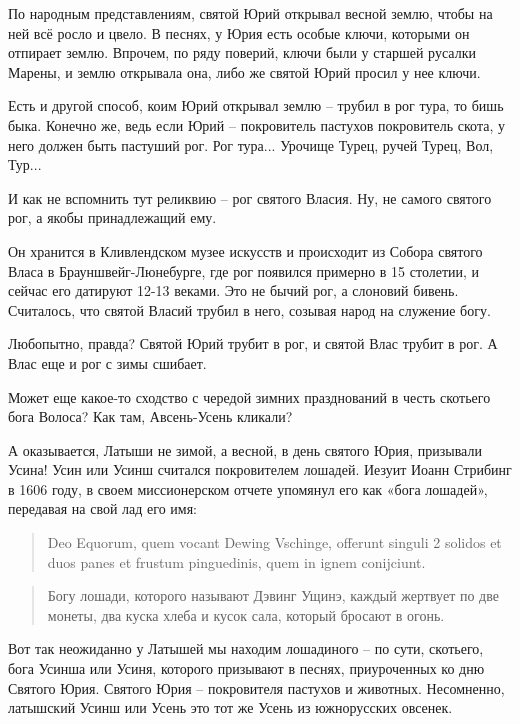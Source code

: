 \documentclass[a5paper,11pt,openany]{article}
\begin{document}
   По народным представлениям, святой Юрий открывал весной землю, чтобы на ней всё росло и цвело. В песнях, у Юрия есть особые ключи, которыми он отпирает землю. Впрочем, по ряду поверий, ключи были у старшей русалки Марены, и землю открывала она, либо же святой Юрий просил у нее ключи.

  Есть и другой способ, коим Юрий открывал землю – трубил в рог тура, то бишь быка. Конечно же, ведь если Юрий – покровитель пастухов покровитель скота, у него должен быть пастуший рог. Рог тура... Урочище Турец, ручей Турец, Вол, Тур...

   И как не вспомнить тут реликвию – рог святого Власия. Ну, не самого святого рог, а якобы принадлежащий ему.

   
   Он хранится в Кливлендском музее искусств и происходит из Собора святого Власа в Брауншвейг-Люнебурге, где рог появился примерно в 15 столетии, и сейчас его датируют 12-13 веками. Это не бычий рог, а слоновий бивень. Считалось, что святой Власий трубил в него, созывая народ на служение богу.

   Любопытно, правда? Святой Юрий трубит в рог, и святой Влас трубит в рог. А Влас еще и рог с зимы сшибает.

 Может еще какое-то сходство с чередой зимних празднований в честь скотьего бога Волоса? Как там, Авсень-Усень кликали?

А оказывается, Латыши не зимой, а весной, в день святого Юрия, призывали Усина! Усин или Усинш считался покровителем лошадей. Иезуит Иоанн Стрибинг в 1606 году, в своем миссионерском отчете упомянул его как «бога лошадей», передавая на свой лад его имя:

\begin{quotation}
\noindent Deo Equorum, quem vocant Dewing Vschinge, offerunt singuli 2 solidos et duos panes et frustum pinguedinis, quem in ignem conijciunt.\end{quotation}

\begin{quotation}
\noindent Богу лошади, которого называют Дэвинг Ущинэ, каждый жертвует по две монеты, два куска хлеба и кусок сала, который бросают в огонь.
\end{quotation}

   Вот так неожиданно у Латышей мы находим лошадиного – по сути, скотьего, бога Усинша или Усиня, которого призывают в песнях, приуроченных ко дню Святого Юрия. Святого Юрия – покровителя пастухов и животных. Несомненно, латышский Усинш или Усень это тот же Усень из южнорусских овсенек.
\end{document}
